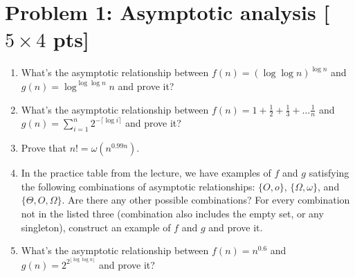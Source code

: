 \documentclass[letterpaper, 11pt]{article}
\newcommand{\1}{\mathds{1}}	%
\theoremstyle{definition}
\newcommand{\problem}[1]{\section*{Problem #1}}
\begin{document}
\problem{1: Asymptotic analysis [$5 \times 4$ pts]} 
\begin{enumerate}
    \item What's the asymptotic relationship between $f(n) = (\log\log n)^{\log n}$ and $g(n) = \log^{\log\log n}n$ and prove it?
    \item What's the asymptotic relationship between $f(n) = 1 + \frac{1}{2} + \frac{1}{3} + \ldots \frac{1}{n}$ and $g(n) = \sum_{i=1}^{n} 2^{-\lceil\log i \rceil}$ and prove it?
    \item Prove that $n! = \omega(n^{0.99n})$.
    
    \item In the practice table from the lecture, we have examples of $f$ and $g$ satisfying the following combinations of asymptotic relationships: $\{O, o\}$, $\{\Omega, \omega\}$, and $\{\Theta, O, \Omega\}$. Are there any other possible combinations? For every combination not in the listed three (combination also includes the empty set, or any singleton), construct an example of $f$ and $g$ and prove it.
    
    \item What's the asymptotic relationship between $f(n)=n^{0.6}$ and $g(n) = 2^{2^{\lfloor \log\log n \rfloor}}$ and prove it?
    
    \end{enumerate}
\end{document}
